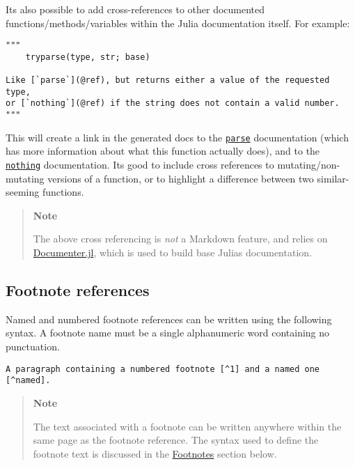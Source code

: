 It{\textquotesingle}s also possible to add cross-references to other documented functions/methods/variables within the Julia documentation itself. For example:




\begin{verbatim}
"""
    tryparse(type, str; base)

Like [`parse`](@ref), but returns either a value of the requested type,
or [`nothing`](@ref) if the string does not contain a valid number.
"""
\end{verbatim}



This will create a link in the generated docs to the \hyperlink{14207407853646164654}{\texttt{parse}} documentation (which has more information about what this function actually does), and to the \hyperlink{9331422207248206047}{\texttt{nothing}} documentation. It{\textquotesingle}s good to include cross references to mutating/non-mutating versions of a function, or to highlight a difference between two similar-seeming functions.



\begin{quote}
\textbf{Note}

The above cross referencing is \emph{not} a Markdown feature, and relies on \href{https://github.com/JuliaDocs/Documenter.jl}{Documenter.jl}, which is used to build base Julia{\textquotesingle}s documentation.

\end{quote}


\hypertarget{1886176754537713588}{}


\subsection{Footnote references}



Named and numbered footnote references can be written using the following syntax. A footnote name must be a single alphanumeric word containing no punctuation.




\begin{lstlisting}
A paragraph containing a numbered footnote [^1] and a named one [^named].
\end{lstlisting}



\begin{quote}
\textbf{Note}

The text associated with a footnote can be written anywhere within the same page as the footnote reference. The syntax used to define the footnote text is discussed in the \hyperlink{16845496644619434430}{Footnotes} section below.

\end{quote}


